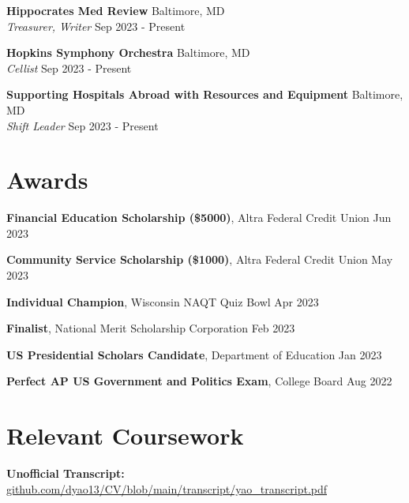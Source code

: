 \documentclass[11pt]{article}       %
\begin{document}
\textbf{Hippocrates Med Review} \hfill Baltimore, MD \\
\textit{Treasurer, Writer} \hfill Sep 2023 - Present \\

\vspace{5pt}

\textbf{Hopkins Symphony Orchestra} \hfill Baltimore, MD \\
\textit{Cellist} \hfill Sep 2023 - Present \\

\vspace{5pt}

\textbf{Supporting Hospitals Abroad with Resources and Equipment} \hfill Baltimore, MD \\
\textit{Shift Leader} \hfill Sep 2023 - Present \\

\vspace{-9pt}

\section*{Awards}
\textbf{Financial Education Scholarship (\$5000)}, Altra Federal Credit Union \hfill Jun 2023 \\

\vspace{5pt}

\textbf{Community Service Scholarship (\$1000)}, Altra Federal Credit Union \hfill May 2023 \\

\vspace{5pt}

\textbf{Individual Champion}, Wisconsin NAQT Quiz Bowl \hfill Apr 2023 \\

\vspace{5pt}

\textbf{Finalist}, National Merit Scholarship Corporation \hfill Feb 2023 \\

\vspace{5pt}

\textbf{US Presidential Scholars Candidate}, Department of Education \hfill Jan 2023 \\

\vspace{5pt}

\textbf{Perfect AP US Government and Politics Exam}, College Board \hfill Aug 2022

\vspace{-9pt}

\section*{Relevant Coursework}
\textbf{Unofficial Transcript:} \href{https://github.com/dyao13/CV/blob/main/transcript/yao_transcript.pdf}{github.com/dyao13/CV/blob/main/transcript/yao\_transcript.pdf}
\end{document}
